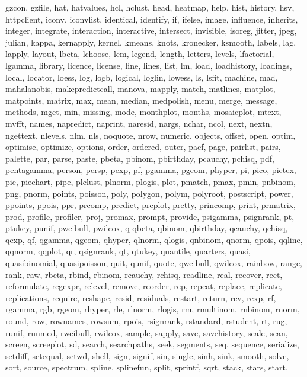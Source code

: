 {{        gzcon, gzfile, hat, hatvalues, hcl, hclust, head, heatmap, help, hist, history, hsv, httpclient, iconv, iconvlist, identical, identify, if, ifelse, image,
        influence, inherits, integer, integrate, interaction, interactive, intersect, invisible, isoreg, jitter, jpeg, julian, kappa, kernapply, kernel, kmeans, knots,
        kronecker, ksmooth, labels, lag, lapply, layout, lbeta, lchoose, lcm, legend, length, letters, levels, lfactorial, lgamma, library, licence, license, line, lines,
        list, lm, load, loadhistory, loadings, local, locator, loess, log, logb, logical, loglin, lowess, ls, lsfit, machine, mad, mahalanobis, makepredictcall, manova,
        mapply, match, matlines, matplot, matpoints, matrix, max, mean, median, medpolish, menu, merge, message, methods, mget, min, missing, mode, monthplot, months,
        mosaicplot, mtext, mvfft, names, napredict, naprint, naresid, nargs, nchar, ncol, next, nextn, ngettext, nlevels, nlm, nls, noquote, nrow, numeric, objects, offset,
        open, optim, optimise, optimize, options, order, ordered, outer, pacf, page, pairlist, pairs, palette, par, parse, paste, pbeta, pbinom, pbirthday, pcauchy, pchisq,
        pdf, pentagamma, person, persp, pexp, pf, pgamma, pgeom, phyper, pi, pico, pictex, pie, piechart, pipe, plclust, plnorm, plogis, plot, pmatch, pmax, pmin, pnbinom,
        png, pnorm, points, poisson, poly, polygon, polym, polyroot, postscript, power, ppoints, ppois, ppr, prcomp, predict, preplot, pretty, princomp, print, prmatrix,
        prod, profile, profiler, proj, promax, prompt, provide, psigamma, psignrank, pt, ptukey, punif, pweibull, pwilcox, q qbeta, qbinom, qbirthday, qcauchy, qchisq, qexp,
        qf, qgamma, qgeom, qhyper, qlnorm, qlogis, qnbinom, qnorm, qpois, qqline, qqnorm, qqplot, qr, qsignrank, qt, qtukey, quantile, quarters, quasi, quasibinomial,
        quasipoisson, quit, qunif, quote, qweibull, qwilcox, rainbow, range, rank, raw, rbeta, rbind, rbinom, rcauchy, rchisq, readline, real, recover, rect, reformulate,
        regexpr, relevel, remove, reorder, rep, repeat, replace, replicate, replications, require, reshape, resid, residuals, restart, return, rev, rexp, rf, rgamma, rgb,
        rgeom, rhyper, rle, rlnorm, rlogis, rm, rmultinom, rnbinom, rnorm, round, row, rownames, rowsum, rpois, rsignrank, rstandard, rstudent, rt, rug, runif, runmed,
        rweibull, rwilcox, sample, sapply, save, savehistory, scale, scan, screen, screeplot, sd, search, searchpaths, seek, segments, seq, sequence, serialize, setdiff,
        setequal, setwd, shell, sign, signif, sin, single, sinh, sink, smooth, solve, sort, source, spectrum, spline, splinefun, split, sprintf, sqrt, stack, stars, start,
}}
